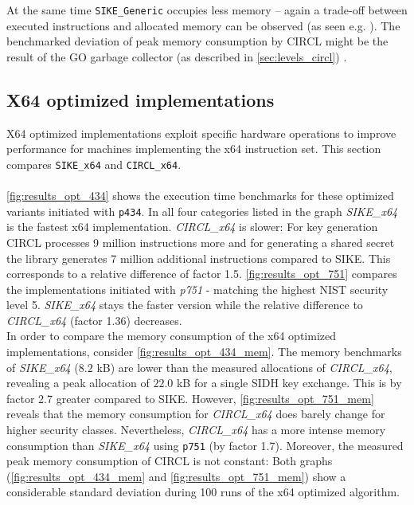 At the same time \texttt{SIKE\_Generic} occupies less memory -- again a trade-off between executed instructions and allocated memory can be observed (as seen e.g. \parencite{1056220}). The benchmarked deviation of peak memory consumption by \gls{CIRCL} might be the result of the GO garbage collector (as described in \autoref{sec:levels_circl}) \parencite{Hudson:GGC}.

\subsection{X64 optimized implementations}
\label{sec:sike_circl_analysis_x64}
X64 optimized implementations exploit specific hardware operations to improve performance for machines implementing the x64 instruction set. This section compares \texttt{SIKE\_x64} and \texttt{CIRCL\_x64}.
\\\\
\autoref{fig:results_opt_434} shows the execution time benchmarks for these optimized variants initiated with \texttt{p434}. In all four categories listed in the graph \textit{SIKE\_x64}  is the fastest x64 implementation. \textit{CIRCL\_x64} is slower: For key generation \gls{CIRCL} processes 9 million instructions more and for generating a shared secret the library generates 7 million additional instructions compared to \gls{SIKE}. This corresponds to a relative difference of factor 1.5.
\autoref{fig:results_opt_751} compares the implementations initiated with \textit{p751} - matching the highest \gls{NIST} security level 5. \textit{SIKE\_x64} stays the faster version while the relative difference to \textit{CIRCL\_x64} (factor 1.36) decreases.
\\
In order to compare the memory consumption of the x64 optimized implementations, consider \autoref{fig:results_opt_434_mem}. The memory benchmarks of \textit{SIKE\_x64} ($8.2$ \gls{kB}) are  lower than the measured allocations of \textit{\gls{CIRCL}\_x64}, revealing  a peak allocation of $22.0$ \gls{kB} for a single \gls{SIDH} key exchange. This is by factor 2.7 greater compared to \gls{SIKE}. However, \autoref{fig:results_opt_751_mem} reveals that the memory consumption for \textit{\gls{CIRCL}\_x64} does barely change for higher security classes. Nevertheless,  \textit{\gls{CIRCL}\_x64} has a more intense memory consumption than \textit{SIKE\_x64} using \texttt{p751} (by factor 1.7). Moreover, the measured peak memory consumption of \gls{CIRCL} is not constant: Both graphs (\ref{fig:results_opt_434_mem} and \ref{fig:results_opt_751_mem}) show a considerable standard deviation during 100 runs of the x64 optimized algorithm.
